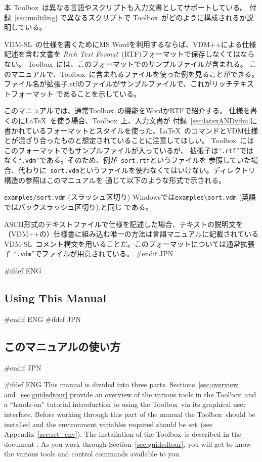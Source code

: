\documentclass[\pformat,12pt]{article}
\newcommand{\vdmslpp}{VDM-SL}
\newcommand{\Toolbox}{Toolbox}
\newcommand{\vdmext}{vdm}
\newcommand{\vdmslpp}{VDM++}
\newcommand{\Toolbox}{Toolbox}
\newcommand{\vdmext}{vpp}
\begin{document}
本 \Toolbox\ は異なる言語やスクリプトも入力文書としてサポートしている。
付録~\ref{sec:multiling}
で異なるスクリプトで \Toolbox\ がどのように構成されるか説明している。

\vdmslpp\ の仕様を書くためにMS Wordを利用するならば、VDM++による仕様記述を含む文書を
{\em Rich Text Format\/}~(RTF)フォーマットで保存しなくてはならない。
\Toolbox\ には、このフォーマットでのサンプルファイルが含まれる。
このマニュアルで、\Toolbox\ に含まれるファイルを使った例を見ることができる。
ファイル名が拡張子.rtfのファイルがサンプルファイルで、これがリッチテキストフォーマット
であることを示している。

このマニュアルでは、通常\Toolbox\ の機能をWordかRTFで紹介する。
仕様を書くのに\LaTeX\ を使う場合、\Toolbox\ 上、入力文書が
付録~\ref{sec:latexANDvdm}に書かれているフォーマットとスタイルを使った、\LaTeX\ 
のコマンドとVDM仕様とが混ざり合ったものと想定されていることに注意してほしい。
\Toolbox\ にはこのフォーマットでもサンプルファイルが入っているが、
拡張子は``{\tt .rtf}''ではなく``{\tt .\vdmext}''である。そのため、例が{\tt
  sort.rtf}というファイルを
参照していた場合、代わりに{\tt
  sort.\vdmext}というファイルを使わなくてはいけない。ディレクトリ構造の参照はこのマニュアルを
通じて以下のような形式で示される。

{\tt examples/sort.vdm} (スラッシュ区切り)  
Windowsでは\verb+examples\sort.vdm+ (英語ではバックスラッシュ区切り).と同じ
である。

ASCII形式のテキストファイルで仕様を記述した場合、テキストの説明文を
（VDM++の）仕様書に組み込む唯一の方法は言語マニュアルに記載されている
\vdmslpp\ コメント構文を用いることだ。このフォーマットについては通常拡張子
``{\tt .\vdmext}''でファイルが用意されている。
#endif JPN

#ifdef ENG
\subsection*{Using This Manual}
#endif ENG
#ifdef JPN
\subsection*{このマニュアルの使い方}
#endif JPN

#ifdef ENG
This manual is divided into three parts. Sections~\ref{sec:overview}
and~\ref{sec:guidedtour} provide an overview of the various tools in
the \Toolbox\ and a ``hands-on'' tutorial introduction to using the
\Toolbox\ via its graphical user interface.  Before working through
this part of the manual the \Toolbox\ should be installed and the
environment variables required should be set~(see
Appendix~\ref{sec:set_env}). The installation of the \Toolbox\ is
described in the document
.
As you work through Section~\ref{sec:guidedtour}, you will get to know
the various tools and control commands available to you.
\end{document}
